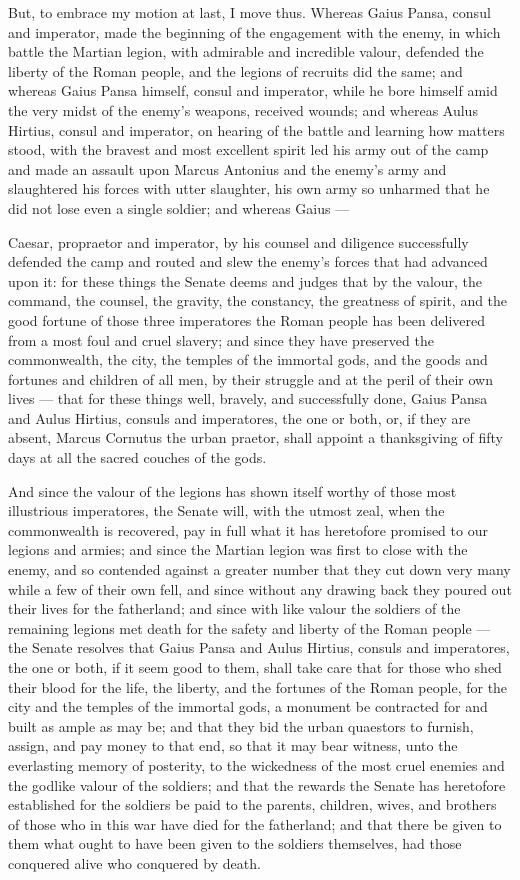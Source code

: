  But, to embrace my motion at last, I move thus. Whereas Gaius Pansa, consul and imperator, made the beginning of the engagement with the enemy, in which battle the Martian legion, with admirable and incredible valour, defended the liberty of the Roman people, and the legions of recruits did the same; and whereas Gaius Pansa himself, consul and imperator, while he bore himself amid the very midst of the enemy's weapons, received wounds; and whereas Aulus Hirtius, consul and imperator, on hearing of the battle and learning how matters stood, with the bravest and most excellent spirit led his army out of the camp and made an assault upon Marcus Antonius and the enemy's army and slaughtered his forces with utter slaughter, his own army so unharmed that he did not lose even a single soldier; and whereas Gaius ---

 Caesar, propraetor and imperator, by his counsel and diligence successfully defended the camp and routed and slew the enemy's forces that had advanced upon it: for these things the Senate deems and judges that by the valour, the command, the counsel, the gravity, the constancy, the greatness of spirit, and the good fortune of those three imperatores the Roman people has been delivered from a most foul and cruel slavery; and since they have preserved the commonwealth, the city, the temples of the immortal gods, and the goods and fortunes and children of all men, by their struggle and at the peril of their own lives --- that for these things well, bravely, and successfully done, Gaius Pansa and Aulus Hirtius, consuls and imperatores, the one or both, or, if they are absent, Marcus Cornutus the urban praetor, shall appoint a thanksgiving of fifty days at all the sacred couches of the gods.

 And since the valour of the legions has shown itself worthy of those most illustrious imperatores, the Senate will, with the utmost zeal, when the commonwealth is recovered, pay in full what it has heretofore promised to our legions and armies; and since the Martian legion was first to close with the enemy, and so contended against a greater number that they cut down very many while a few of their own fell, and since without any drawing back they poured out their lives for the fatherland; and since with like valour the soldiers of the remaining legions met death for the safety and liberty of the Roman people --- the Senate resolves that Gaius Pansa and Aulus Hirtius, consuls and imperatores, the one or both, if it seem good to them, shall take care that for those who shed their blood for the life, the liberty, and the fortunes of the Roman people, for the city and the temples of the immortal gods, a monument be contracted for and built as ample as may be; and that they bid the urban quaestors to furnish, assign, and pay money to that end, so that it may bear witness, unto the everlasting memory of posterity, to the wickedness of the most cruel enemies and the godlike valour of the soldiers; and that the rewards the Senate has heretofore established for the soldiers be paid to the parents, children, wives, and brothers of those who in this war have died for the fatherland; and that there be given to them what ought to have been given to the soldiers themselves, had those conquered alive who conquered by death.
